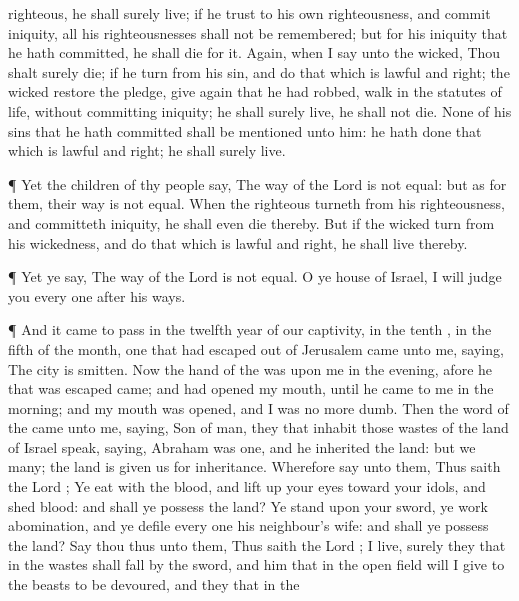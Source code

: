 {righteous,
{} he shall
surely
live; if he
trust to his own
righteousness, and
commit
iniquity, all his
righteousnesses shall not be
remembered; but for his
iniquity that he hath
committed, he shall
die for it.
Again, when I
say unto the
wicked, Thou shalt
surely
die; if he
turn from his
sin, and
do that which is
lawful and
right;
 the
wicked
restore the
pledge, give
again that he had
robbed,
walk in the
statutes of
life, without
committing
iniquity; he shall
surely
live, he shall not
die.
None of his
sins that he hath
committed shall be
mentioned unto him: he hath
done that which is
lawful and
right; he shall
surely
live.
\par }{\PP {}¶ Yet the
children of thy
people
say, The
way of the
Lord is not
equal: but as for them, their
way is not
equal.
When the
righteous
turneth from his
righteousness, and
committeth
iniquity, he shall even
die thereby.
But if the
wicked
turn from his
wickedness, and
do that which is
lawful and
right, he shall
live thereby.
\par }{\PP {}¶ Yet ye
say, The
way of the
Lord is not
equal. O ye
house of
Israel, I will
judge you every
one after his
ways.
\par }{\PP {}¶ And it came to pass in the
twelfth
year of our
captivity, in the
tenth
{}, in the
fifth
{} of the
month,
{} one that had
escaped out of
Jerusalem
came unto me,
saying, The
city is
smitten.
Now the
hand of the
{} was upon me in the
evening,
afore he that was
escaped
came; and had
opened my
mouth, until he
came to me in the
morning; and my
mouth was
opened, and I was no more
dumb.
Then the
word of the
{} came unto me,
saying,
Son of
man, they that
inhabit those
wastes of the
land of
Israel
speak,
saying,
Abraham was
one, and he
inherited the
land: but we
{}
many; the
land is
given us for
inheritance.
Wherefore
say unto them, Thus
saith the
Lord
{}; Ye
eat with the
blood, and lift
up your
eyes toward your
idols, and
shed
blood: and shall ye
possess the
land?
Ye
stand upon your
sword, ye
work
abomination, and ye
defile every
one his
neighbour’s
wife: and shall ye
possess the
land?
Say thou thus unto them, Thus
saith the
Lord
{};
{} I
live, surely they that
{} in the
wastes shall
fall by the
sword, and him that
{} in the
open
field will I
give to the
beasts to be
devoured, and they that
{} in the
}
